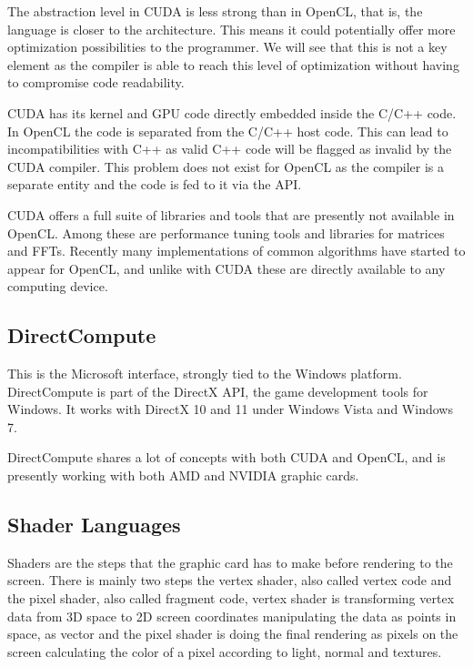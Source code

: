 The abstraction level in \gls{CUDA} is less strong than in \gls{OpenCL}, that is, the language is closer to the architecture. This means it could potentially offer more optimization possibilities to the programmer. We will see that this is not a key element as the compiler is able to reach this level of optimization without having to compromise code readability.

\Gls{CUDA} has its kernel and \gls{GPU} code directly embedded inside the C/C++ code. In \gls{OpenCL} the code is separated from the C/C++ host code. This can lead to incompatibilities with C++ as valid C++ code will be flagged as invalid by the \gls{CUDA} compiler. This problem does not exist for \gls{OpenCL} as the compiler is a separate entity and the code is fed to it via the \gls{API}. 

\Gls{CUDA} offers a full suite of libraries and tools that are presently not available in \gls{OpenCL}. Among these are performance tuning tools and libraries for matrices and \glspl{FFT}. Recently many implementations of common algorithms have started to appear for \gls{OpenCL}, and unlike with \gls{CUDA} these are directly available to any computing device.

\subsection{DirectCompute}

This is the Microsoft interface, strongly tied to the Windows platform. DirectCompute is part of the DirectX API, the game development tools for Windows. It works with DirectX 10 and 11 under Windows Vista and Windows 7. 

DirectCompute shares a lot of concepts with both \gls{CUDA} and \gls{OpenCL}, and is presently working with both AMD and NVIDIA graphic cards.

\subsection{Shader Languages}

Shaders are the steps that the graphic card has to make before rendering to the screen. There is mainly two steps the vertex shader, also called vertex code and the pixel shader, also called fragment code, vertex shader is transforming vertex data from 3D space to 2D screen coordinates manipulating the data as points in space, as vector and the pixel shader is doing the final rendering as pixels on the screen calculating the color of a pixel according to light, normal and textures.

